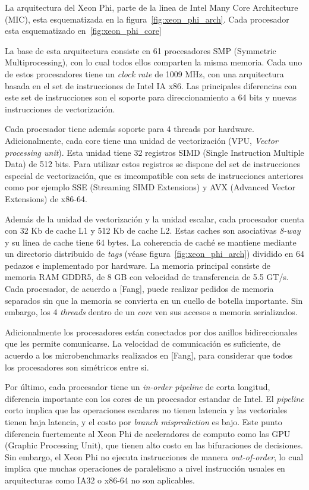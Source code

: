 La arquitectura del Xeon Phi, parte de la linea de Intel Many Core Architecture (MIC), esta esquematizada
en la figura~\ref{fig:xeon_phi_arch}. Cada procesador esta esquematizado en~\ref{fig:xeon_phi_core}

La base de esta arquitectura consiste en 61 procesadores SMP (Symmetric Multiprocessing), con lo cual todos
ellos comparten la misma memoria. Cada uno de estos procesadores tiene un \textit{clock rate} de 1009 MHz, 
con una arquitectura basada en el set de instrucciones de Intel IA x86. Las principales diferencias con este
set de instrucciones son el soporte para direccionamiento a 64 bits y nuevas instrucciones de vectorización. 

Cada procesador tiene además soporte para 4 threads por hardware. Adicionalmente, cada core tiene una unidad
de vectorización (VPU, \textit{Vector processing unit}). Esta unidad tiene 32 registros SIMD (Single Instruction
Multiple Data) de 512 bits. Para utilizar estos registros se dispone del set de instrucciones especial de vectorización, 
que es imcompatible con sets de instrucciones anteriores como por ejemplo SSE (Streaming SIMD Extensions) y AVX (Advanced
Vector Extensions) de x86-64.

Además de la unidad de vectorización y la unidad escalar, cada procesador cuenta con 32 Kb de cache L1 y 512 Kb de cache
L2. Estas caches son asociativas \textit{8-way} y su linea de cache tiene 64 bytes. La coherencia de caché se mantiene
mediante un directorio distribuido de \textit{tags} (véase figura~\ref{fig:xeon_phi_arch}) dividido en 64 pedazos e implementado
por hardware. La memoria principal consiste de memoria RAM GDDR5, de 8 GB con velocidad de transferencia de 5.5 GT/s. 
Cada procesador, de acuerdo a [Fang], puede realizar pedidos de memoria separados sin que la memoria se convierta en un cuello
de botella importante. Sin embargo, los 4 \textit{threads} dentro de un \textit{core} ven sus accesos a memoria serializados.

Adicionalmente los procesadores están conectados por dos anillos bidireccionales que les permite comunicarse. La velocidad de
comunicación es suficiente, de acuerdo a los microbenchmarks realizados en [Fang], para considerar que todos los procesadores son
simétricos entre si. 

Por último, cada procesador tiene un \textit{in-order pipeline} de corta longitud, diferencia importante con los cores de un procesador
estandar de Intel. El \textit{pipeline} corto implica que las operaciones escalares no tienen latencia y las vectoriales tienen baja latencia,
y el costo por \textit{branch misprediction} es bajo. Este punto diferencia fuertemente al Xeon Phi de aceleradores de computo como las GPU
(Graphic Processing Unit), que tienen alto costo en las bifuraciones de decisiones. Sin embargo, el Xeon Phi no ejecuta instrucciones de manera
\textit{out-of-order}, lo cual implica que muchas operaciones de paralelismo a nivel instrucción usuales en arquitecturas como IA32 o x86-64 no son
aplicables.

